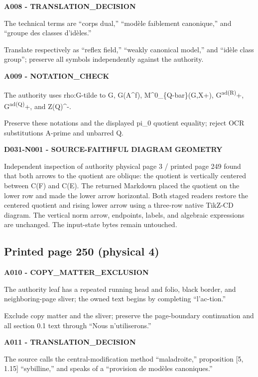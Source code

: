 \documentclass[10pt,a4paper]{article}
\begin{document}
\textbf{A008 - TRANSLATION\_DECISION}

The technical terms are ``corps dual,'' ``modèle faiblement canonique,'' and ``groupe des classes d'idèles.''

Translate respectively as ``reflex field,'' ``weakly canonical model,'' and ``idèle class group''; preserve all symbols independently against the authority.

\textbf{A009 - NOTATION\_CHECK}

The authority uses rho:G-tilde to G, G(A\^{}f), M\^{}0\_\{Q-bar\}(G,X+), G\textsuperscript{ad(R)}+, G\textsuperscript{ad(Q)}+, and Z(Q)\^{}-.

Preserve these notations and the displayed pi\_0 quotient equality; reject OCR substitutions A-prime and unbarred Q.

\textbf{D031-N001 - SOURCE-FAITHFUL DIAGRAM GEOMETRY}

Independent inspection of authority physical page 3 / printed page 249 found that both arrows to the quotient are oblique: the quotient is vertically centered between C(F) and C(E). The returned Markdown placed the quotient on the lower row and made the lower arrow horizontal. Both staged readers restore the centered quotient and rising lower arrow using a three-row native TikZ-CD diagram. The vertical norm arrow, endpoints, labels, and algebraic expressions are unchanged. The input-state bytes remain untouched.

\subsection{Printed page 250 (physical 4)}

\textbf{A010 - COPY\_MATTER\_EXCLUSION}

The authority leaf has a repeated running head and folio, black border, and neighboring-page sliver; the owned text begins by completing ``l'ac-tion.''

Exclude copy matter and the sliver; preserve the page-boundary continuation and all section 0.1 text through ``Nous n'utiliserons.''

\textbf{A011 - TRANSLATION\_DECISION}

The source calls the central-modification method ``maladroite,'' proposition {[}5, 1.15{]} ``sybilline,'' and speaks of a ``provision de modèles canoniques.''
\end{document}

